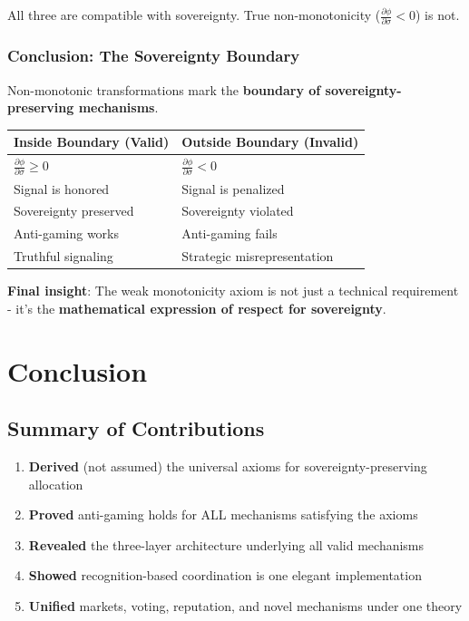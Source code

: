\documentclass[11pt,a4paper]{article}
\theoremstyle{definition}
\theoremstyle{remark}
\begin{document}
All three are compatible with sovereignty. True non-monotonicity ($\frac{\partial \phi}{\partial \sigma} < 0$) is not.

\subsubsection{Conclusion: The Sovereignty Boundary}

Non-monotonic transformations mark the \textbf{boundary of sovereignty-preserving mechanisms}.

\begin{center}
\begin{tabular}{ll}
\toprule
\textbf{Inside Boundary (Valid)} & \textbf{Outside Boundary (Invalid)} \\
\midrule
$\frac{\partial \phi}{\partial \sigma} \ge 0$ & $\frac{\partial \phi}{\partial \sigma} < 0$ \\
Signal is honored & Signal is penalized \\
Sovereignty preserved & Sovereignty violated \\
Anti-gaming works & Anti-gaming fails \\
Truthful signaling & Strategic misrepresentation \\
\bottomrule
\end{tabular}
\end{center}

\textbf{Final insight}: The weak monotonicity axiom is not just a technical requirement - it's the \textbf{mathematical expression of respect for sovereignty}.

\section{Conclusion}

\subsection{Summary of Contributions}

\begin{enumerate}
\item \textbf{Derived} (not assumed) the universal axioms for sovereignty-preserving allocation
\item \textbf{Proved} anti-gaming holds for ALL mechanisms satisfying the axioms
\item \textbf{Revealed} the three-layer architecture underlying all valid mechanisms
\item \textbf{Showed} recognition-based coordination is one elegant implementation
\item \textbf{Unified} markets, voting, reputation, and novel mechanisms under one theory
\end{enumerate}
\end{document}
